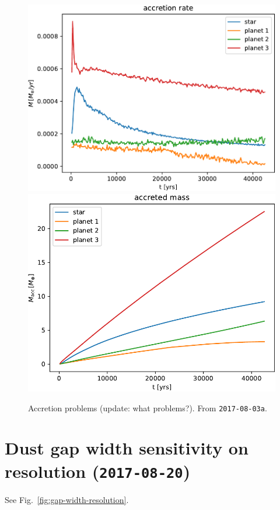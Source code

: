 \documentclass[usenatbib,a4paper,times,fleqn]{mnras}
\begin{document}
\begin{figure}
   \begin{center}
      \includegraphics[height=0.35\columnwidth]{figs/mdot_2017-08-03a.pdf}
      \includegraphics[height=0.35\columnwidth]{figs/macc_2017-08-03a.pdf}
      \caption{Accretion problems (update: what problems?). From
      \texttt{2017-08-03a}.}
      \label{fig:accretion-problems}
   \end{center}
\end{figure}


\section*{Dust gap width sensitivity on resolution (\texttt{2017-08-20})}

See Fig.~\ref{fig:gap-width-resolution}.
\end{document}
